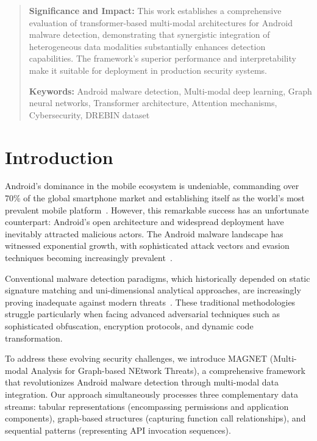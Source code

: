 \documentclass[a4paper,11pt]{article}
\begin{document}
\begin{abstract}
\textbf{Significance and Impact:} This work establishes a comprehensive evaluation of transformer-based multi-modal architectures for Android malware detection, demonstrating that synergistic integration of heterogeneous data modalities substantially enhances detection capabilities. The framework's superior performance and interpretability make it suitable for deployment in production security systems.

\textbf{Keywords:} Android malware detection, Multi-modal deep learning, Graph neural networks, Transformer architecture, Attention mechanisms, Cybersecurity, DREBIN dataset

\end{abstract}

\newpage
\twocolumn

\section{Introduction}
Android's dominance in the mobile ecosystem is undeniable, commanding over 70\% of the global smartphone market and establishing itself as the world's most prevalent mobile platform~\cite{AndroidSecurity}. However, this remarkable success has an unfortunate counterpart: Android's open architecture and widespread deployment have inevitably attracted malicious actors. The Android malware landscape has witnessed exponential growth, with sophisticated attack vectors and evasion techniques becoming increasingly prevalent~\cite{DeepLearningMalware}.

Conventional malware detection paradigms, which historically depended on static signature matching and uni-dimensional analytical approaches, are increasingly proving inadequate against modern threats~\cite{AndroidMalwareSurvey}. These traditional methodologies struggle particularly when facing advanced adversarial techniques such as sophisticated obfuscation, encryption protocols, and dynamic code transformation.

To address these evolving security challenges, we introduce MAGNET (Multi-modal Analysis for Graph-based NEtwork Threats), a comprehensive framework that revolutionizes Android malware detection through multi-modal data integration. Our approach simultaneously processes three complementary data streams: tabular representations (encompassing permissions and application components), graph-based structures (capturing function call relationships), and sequential patterns (representing API invocation sequences).
\end{document}
